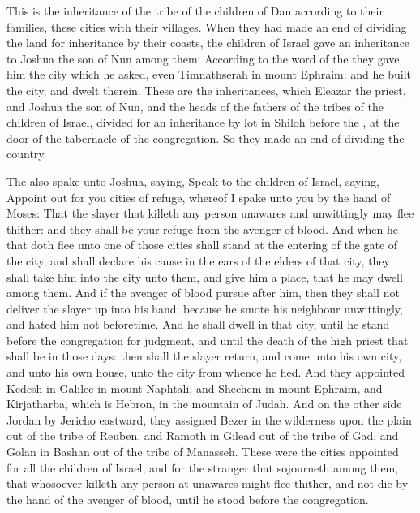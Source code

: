 \begin{biblechapter}
\verse This is the inheritance of the tribe of the children of Dan according to their families, these cities with their villages.
 When they had made an end of dividing the land for inheritance by their coasts, the children of Israel gave an inheritance to Joshua the son of Nun among them:
\verse According to the word of the \LORD they gave him the city which he asked, even Timnathserah in mount Ephraim: and he built the city, and dwelt therein.
\verse These are the inheritances, which Eleazar the priest, and Joshua the son of Nun, and the heads of the fathers of the tribes of the children of Israel, divided for an inheritance by lot in Shiloh before the \LORD, at the door of the tabernacle of the congregation. So they made an end of dividing the country.
\end{biblechapter}

\begin{biblechapter} %
 The \LORD also spake unto Joshua, saying,
\verse Speak to the children of Israel, saying, Appoint out for you cities of refuge, whereof I spake unto you by the hand of Moses:
\verse That the slayer that killeth any person unawares and unwittingly may flee thither: and they shall be your refuge from the avenger of blood.
\verse And when he that doth flee unto one of those cities shall stand at the entering of the gate of the city, and shall declare his cause in the ears of the elders of that city, they shall take him into the city unto them, and give him a place, that he may dwell among them.
\verse And if the avenger of blood pursue after him, then they shall not deliver the slayer up into his hand; because he smote his neighbour unwittingly, and hated him not beforetime.
\verse And he shall dwell in that city, until he stand before the congregation for judgment, and until the death of the high priest that shall be in those days: then shall the slayer return, and come unto his own city, and unto his own house, unto the city from whence he fled.
\verse And they appointed Kedesh in Galilee in mount Naphtali, and Shechem in mount Ephraim, and Kirjatharba, which is Hebron, in the mountain of Judah.
\verse And on the other side Jordan by Jericho eastward, they assigned Bezer in the wilderness upon the plain out of the tribe of Reuben, and Ramoth in Gilead out of the tribe of Gad, and Golan in Bashan out of the tribe of Manasseh.
\verse These were the cities appointed for all the children of Israel, and for the stranger that sojourneth among them, that whosoever killeth any person at unawares might flee thither, and not die by the hand of the avenger of blood, until he stood before the congregation.
\end{biblechapter}

